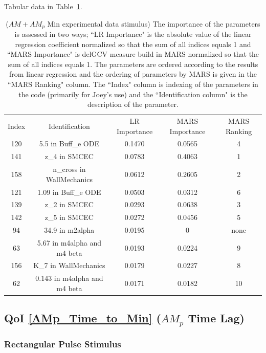 \documentclass[12pt]{article}
\numberwithin{equation}{section}
\begin{document}
Tabular data in Table~\ref{qoi_AM_AMp_Min_ex}.
 
\begin{table}[h]
\centering
\begin{tabular}{ccccc}
Index & Identification & LR Importance & MARS Importance & MARS Ranking \\
120 & 5.5 in Buff\_e ODE & 0.1470 & 0.0565 & 4\\
141 & z\_4 in SMCEC & 0.0783 & 0.4063 & 1\\
158 & n\_cross in WallMechanics & 0.0612 & 0.2605 & 2\\
121 & 1.09 in Buff\_e ODE & 0.0503 & 0.0312 & 6\\
139 & z\_2 in SMCEC & 0.0293 & 0.0638 & 3\\ 
142 & z\_5 in SMCEC & 0.0272 & 0.0456 & 5\\ 
94 & 34.9 in m2alpha & 0.0195 & 0 & none \\
63 &   5.67 in m4alpha and m4 beta &  0.0193 &  0.0224 & 9\\
156 & K\_7 in WallMechanics & 0.0179 & 0.0227 & 8\\
62 & 0.143 in m4alpha and m4 beta & 0.0171 & 0.0182 & 10\\
\end{tabular}
\caption{($AM+AM_p$ Min experimental data stimulus) The importance of the parameters is assessed in two ways; ``LR Importance" is the absolute value of the linear regression coefficient normalized so that the sum of all indices equals 1 and ``MARS Importance" is delGCV measure build in MARS normalized so that the sum of all indices equals 1. The parameters are ordered according to the results from linear regression and the ordering of parameters by MARS is given in the ``MARS Ranking" column. The ``Index" column is indexing of the parameters in the code (primarily for Joey's use) and the ``Identification column" is the description of the parameter.}
\label{qoi_AM_AMp_Min_ex}
\end{table}

\newpage
\subsection{QoI \eqref{AMp_Time_to_Min} ($AM_p$ Time Lag)}

\subsubsection{Rectangular Pulse Stimulus}
\end{document}
